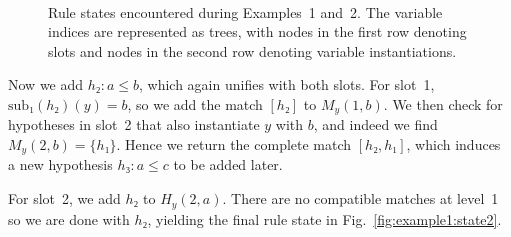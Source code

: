 \documentclass[runningheads]{llncs}
\newcommand{\sub}{\ensuremath{\mathrm{sub}}}
\begin{document}
\begin{figure}
\begin{subcaptiongroup}
\begin{minipage}{\textwidth}
    \end{minipage}
  \end{subcaptiongroup}
  \\[1em]
  \begin{subcaptiongroup}
    \subcaptionlistentry{}
    \begin{minipage}{\textwidth}
    \end{minipage}
  \end{subcaptiongroup}
  \caption{%
    Rule states encountered during Examples~1 and~2.
    The variable indices are represented as trees, with nodes in the first row denoting slots and nodes in the second row denoting variable instantiations.%
  }
\end{figure}

Now we add $h₂ : a ≤ b$, which again unifies with both slots.
For slot~1, $\sub₁(h₂)(y) = b$, so we add the match $[h₂]$ to $M_{y}(1, b)$.
We then check for hypotheses in slot~2 that also instantiate $y$ with $b$, and indeed we find $M_{y}(2, b) = \{h₁\}$.
Hence we return the complete match $[h₂, h₁]$, which induces a new hypothesis $h₃ : a ≤ c$ to be added later.

For slot~2, we add $h₂$ to $H_{y}(2, a)$.
There are no compatible matches at level~1 so we are done with $h₂$, yielding the final rule state in Fig.~\ref{fig:example1:state2}.
\end{document}
